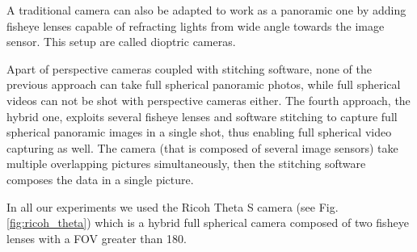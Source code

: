 A traditional camera can also be adapted to work as a panoramic one by adding
fisheye lenses capable of refracting lights from wide angle towards the 
image sensor. This setup are called dioptric cameras.

Apart of perspective cameras coupled with stitching software, none of the 
previous approach can take full spherical panoramic photos, while full spherical 
videos can not be shot with perspective cameras either.
The fourth approach, the hybrid one, exploits several fisheye lenses and 
software stitching to capture full spherical panoramic images in a single shot, 
thus enabling full spherical video capturing as well.
The camera (that is composed of several image sensors) take multiple 
overlapping pictures simultaneously, then the stitching software composes the
data in a single picture.

In all our experiments we used the Ricoh Theta S camera 
(see Fig. \ref{fig:ricoh_theta}) which is a hybrid full spherical camera composed 
of two fisheye lenses with a FOV greater than 180\degree.
\label{fig:ricoh_theta}

\
